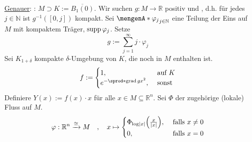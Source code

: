 \uline{Genauer}: \oE: $M \supset K := \overline{B_1(0)}$. Wir suchen $g : M \to \mathds{R}$ positiv und , d.h. für jedes $j \in \mathds{N}$ ist 
$g ^{-1}([0,j])$ kompakt. Sei $\set{\varphi_j}_{j \in \mathds{N}}$ eine Teilung der Eins auf $M$ mit kompaktem Träger, $\operatorname{supp} \varphi_j$. Setze
\[
	g := \sum_{j=1}^{\infty} j \cdot \varphi_j
\]
Sei $K_{1+\delta }$ kompakte $\delta $-Umgebung von $K$, die noch in $M$ enthalten ist.
\[
	f := \begin{cases}
		1, &\text{ auf }K\\
		e^{-\sprod*{\grad g}{x}^2} , &\text{ sonst}
	\end{cases}
\]
Definiere $Y(x) := f(x) \cdot x$ für alle $x \in M \subseteq \mathds{R}^n$. Sei $\Phi $ der zugehörige (lokale) Fluss auf $M$.
\[
	\varphi : \mathds{R}^n \xrightarrow{\cong} M \quad ,\quad  x \mapsto \begin{cases}
		\Phi_{\log \abs*{x}} \enbrace*{ \frac{x}{\abs*{x}}}  , &\text{ falls }x \not= 0\\
		0 , &\text{ falls } x=0
	\end{cases}
\]
